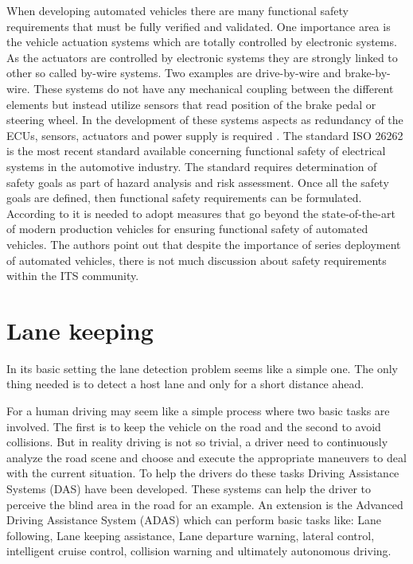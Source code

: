 When developing automated vehicles there are many functional safety requirements that must be fully verified and validated. One importance area is the vehicle actuation systems which are totally controlled by electronic systems. As the actuators are controlled by electronic systems they are strongly linked to other so called by-wire systems. Two examples are drive-by-wire and brake-by-wire. These systems do not have any mechanical coupling between the different elements but instead utilize sensors that read position of the brake pedal or steering wheel. In the development of these systems aspects as redundancy of the ECUs, sensors, actuators and power supply is required \cite{stolte2016safety}. 	The standard ISO 26262 is the most recent standard available concerning functional safety of electrical systems in the automotive industry. The standard requires determination of safety goals as part of hazard analysis and risk assessment. Once all the safety goals are defined, then functional safety requirements can be formulated.\\

According to \cite{stolte2016safety} it is needed to adopt measures that go beyond the state-of-the-art of modern production vehicles for ensuring functional safety of automated vehicles. The authors point out that despite the importance of series deployment of automated vehicles, there is not much discussion about safety requirements within the ITS community.  


\section{Lane keeping}
In its basic setting the lane detection problem seems like a simple one. The only thing needed is to detect a host lane and only for a short distance ahead.

For a human driving may seem like a simple process where two basic tasks are involved. The first is to keep the vehicle on the road and the second to avoid collisions. But in reality driving is not so trivial, a driver need to continuously analyze the road scene and choose and execute the appropriate maneuvers to deal with the current situation. To help the drivers do these tasks Driving Assistance Systems (DAS) have been developed. These systems can help the driver to perceive the blind area in the road for an example. An extension is the Advanced Driving Assistance System (ADAS) which can perform basic tasks like: Lane following, Lane keeping assistance, Lane departure warning, lateral control, intelligent cruise control, collision warning and ultimately autonomous driving.\\

